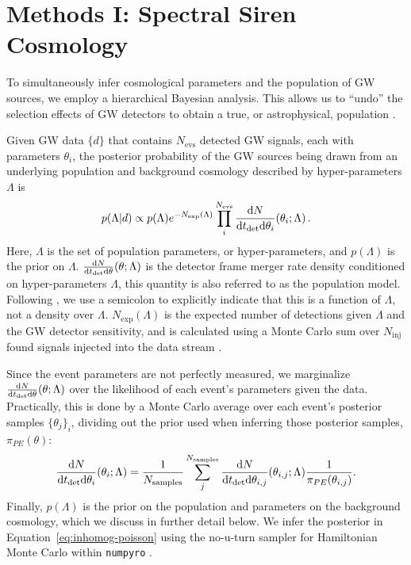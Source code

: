 \documentclass[]{aastex631}
\begin{document}
\section{Methods I: Spectral Siren Cosmology}
\label{sec:ss}

To simultaneously infer cosmological parameters and the population of GW sources, we employ a hierarchical Bayesian analysis.
This allows us to ``undo'' the selection effects of \ac{GW} detectors to obtain a true, or astrophysical, population .

Given \ac{GW} data $\{d\}$ that contains $N_{\text{evs}}$ detected \ac{GW} signals, each with parameters $\theta_i$, the posterior probability of the \ac{GW} sources being drawn from an underlying population and background cosmology described by hyper-parameters $\Lambda$ is \citep{loredo, taylor, mandel}
\begin{equation}
    p(\Lambda|d) \propto p(\Lambda) e^{-N_{\text{exp}}(\Lambda)} \prod_i^{N_{\text{evs}}} \frac{\diff N}{\diff t_{\det} \diff \theta_i} (\theta_i;\Lambda) \, .
    \label{eq:inhomog-poisson}
\end{equation}
Here, $\Lambda$ is the set of population parameters, or hyper-parameters, and $p(\Lambda)$ is the prior on $\Lambda$.
$\frac{\text{d} N}{\text{d} t_{\det} \text{d} \theta} (\theta;\Lambda)$ is the detector frame merger rate density conditioned on hyper-parameters $\Lambda$, this quantity is also referred to as the population model. 
Following \citet{callister_parameter-free_2023}, we use a semicolon to explicitly indicate that this is a function of $\Lambda$, not a density over $\Lambda$.
$N_{\text{exp}}(\Lambda)$ is the expected number of detections given $\Lambda$ and the \ac{GW} detector sensitivity, and is calculated using a Monte Carlo sum over $N_{\text{inj}}$ found signals injected into the data stream \citep[see][for a detailed explanation of this process]{essick}.

Since the event parameters are not perfectly measured, we marginalize $\frac{\text{d} N}{\text{d} t_{\det} \text{d} \theta} (\theta;\Lambda)$ over the likelihood of each event's parameters given the data.
Practically, this is done by a Monte Carlo average over each event's posterior samples $\{\theta_j\}_i$, dividing out the prior used when inferring those posterior samples, $\pi_{PE}(\theta)$:
\begin{equation}
    \frac{\diff N}{\diff t_{\det} \diff \theta_i} (\theta_i;\Lambda) = \frac{1}{N_{\text{samples}}}\sum_j^{N_{\text{samples}}} \frac{\diff N}{\diff t_{\det} \diff \theta_{i,j}} (\theta_{i,j};\Lambda) \frac{1}{\pi_{PE}(\theta_{i,j})} .
    \label{eq:single-event-likelihood}
\end{equation}
Finally, $p(\Lambda)$ is the prior on the population and parameters on the background cosmology, which we discuss in further detail below.
We infer the posterior in Equation~\ref{eq:inhomog-poisson} using the no-u-turn sampler for Hamiltonian Monte Carlo within \texttt{numpyro} \citep{hoffman_no-u-turn_2011, numpyro}. 
\end{document}
